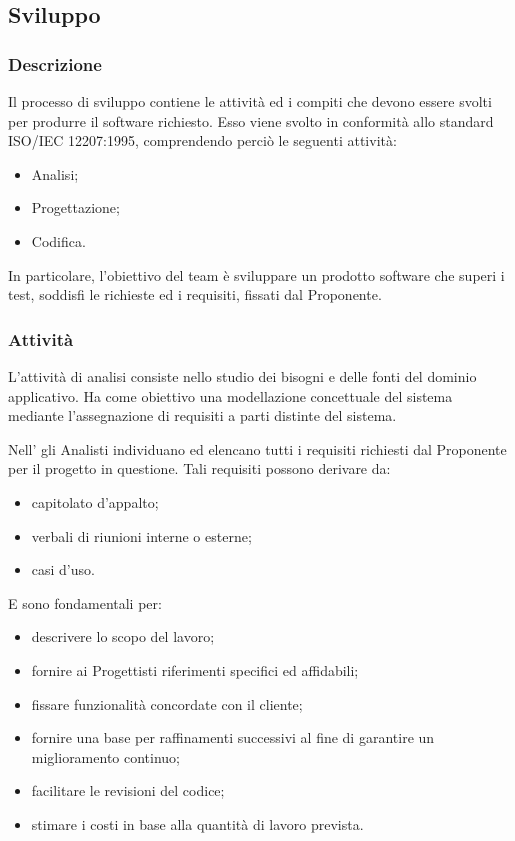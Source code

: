 \subsection{Sviluppo}
	\subsubsection{Descrizione}
	Il processo di sviluppo contiene le attività ed i compiti che devono essere svolti per produrre il software richiesto. Esso viene svolto in conformità allo standard ISO/IEC 12207:1995, comprendendo perciò le seguenti attività:
	\begin{itemize}
		\item{Analisi;}
		\item{Progettazione;}
		\item{Codifica.}
	\end{itemize}

	In particolare, l'obiettivo del team è sviluppare un prodotto software che superi i test, soddisfi le richieste ed i requisiti, fissati dal Proponente.

    \subsubsection{Attività}
	L'attività di analisi consiste nello studio dei bisogni e delle fonti del dominio applicativo. Ha come obiettivo una modellazione concettuale del sistema mediante l'assegnazione di requisiti a parti distinte del sistema.

          	Nell'\AdR{} gli Analisti individuano ed elencano tutti i requisiti richiesti dal Proponente per il progetto in questione. Tali requisiti possono derivare da:
     \begin{itemize}
           		\item{capitolato d'appalto;}
				\item{verbali di riunioni interne o esterne;}
				\item{casi d'uso.}
    	\end{itemize}

          	E sono fondamentali per:
        \begin{itemize}
       		\item{descrivere lo scopo del lavoro;}
			\item{fornire ai Progettisti riferimenti specifici ed affidabili;}
			\item{fissare funzionalità concordate con il cliente;}
			\item{fornire una base per raffinamenti successivi al fine di garantire un miglioramento continuo;}
			\item{facilitare le revisioni del codice;}
			\item{stimare i costi in base alla quantità di lavoro prevista.}
       	\end{itemize}

